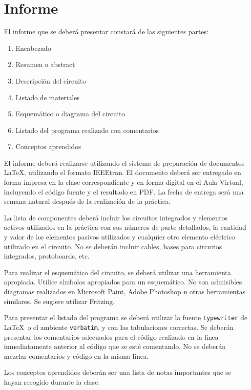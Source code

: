 \documentclass[12pt,letterpaper]{IEEEtran}
\begin{document}
\section{Informe}

El informe que se deberá presentar constará de las siguientes partes:

\begin{enumerate}
  \item Encabezado
  \item Resumen o abstract
  \item Descripción del circuito
  \item Listado de materiales
  \item Esquemático o diagrama del circuito
  \item Listado del programa realizado con comentarios
  \item Conceptos aprendidos
\end{enumerate}

El informe deberá realizarse utilizando el sistema de preparación de documentos \LaTeX, utilizando el formato IEEEtran. El documento deberá ser entregado en forma impresa en la clase correspondiente y en forma digital en el Aula Virtual, incluyendo el código fuente y el resultado en PDF.  La fecha de entrega será una semana natural después de la realización de la práctica.

La lista de componentes deberá incluir los circuitos integrados y elementos activos utilizados en la práctica con sus números de parte detallados, la cantidad y valor de los elementos pasivos utilizados y cualquier otro elemento eléctrico utilizado en el circuito. No se deberán incluir cables, bases para circuitos integrados, protoboards, etc.

Para realizar el esquemático del circuito, se deberá utilizar una herramienta apropiada. Utilice símbolos apropiados para un esquemático. No son admisibles diagramas realizados en Microsoft Paint, Adobe Photoshop u otras herramientas similares. Se sugiere utilizar Fritzing.

Para presentar el listado del programa se deberá utilizar la fuente \texttt{typewriter} de \LaTeX\ o el ambiente \texttt{verbatim}, y con las tabulaciones correctas. Se deberán presentar los comentarios adecuados para el código realizado en la línea inmediatamente anterior al código que se esté comentando. No se deberán mezclar comentarios y código en la misma línea.

Los conceptos aprendidos deberán ser una lista de notas importantes que se hayan recogido durante la clase. 
\end{document}
